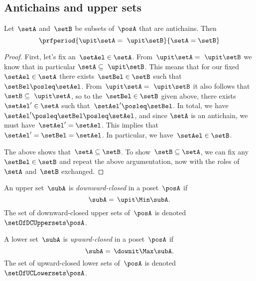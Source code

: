 \subsection{Antichains and upper sets}

\begin{lemma}
    \label{lem:up-cl-inj-antichains}
    Let~$\setA$ and~$\setB$ be subsets of~$\posA$ that are antichains.
    Then
    \begin{equation*}
        \prfperiod{\upit  \setA = \ \upit  \setB}{\setA = \setB}
    \end{equation*}
\end{lemma}

\begin{proof}
    First, let's fix an~$\setAel \in \setA$.
    From~$\upit  \setA = \ \upit  \setB$ we know that in particular $\setA \subseteq \ \upit  \setB$.
    This means that for our fixed~$\setAel \in \setA$ there exists~$\setBel \in \setB$ such that~$\setBel \posleq \setAel$.
    From~$\upit \setA = \ \upit  \setB$ it also follows that~$\setB \subseteq \ \upit  \setA$, so to the~$\setBel \in \setB$ given above, there exists~$\setAel' \in \setA$ such that~$\setAel' \posleq \setBel$.
    In total, we have~$\setAel' \posleq \setBel \posleq \setAel$, and since $\setA$ is an antichain, we must have~$\setAel' = \setAel$.
    This implies that~$\setAel' = \setBel = \setAel$.
    In particular, we have~$\setAel \in \setB$.

    The above shows that~$\setA \subseteq \setB$.
    To show~$\setB \subseteq \setA$, we can fix any~$\setBel \in \setB$ and repeat the above argumentation, now with the roles of~$\setA$ and~$\setB$ exchanged.
\end{proof}

\begin{definition}
    \label{def:downward-closed-upperset}
    An upper set~$\subA$ is \emph{downward-closed} in a poset~$\posA$ if
    \begin{equation}
        \subA =\, \upit  \Min \subA.
    \end{equation}
    The set of downward-closed upper sets of~$\posA$ is denoted~$\setOfDCUppersets \posA$.

\end{definition}

\begin{definition}
    \label{def:upward-closed-lowerset}
    A lower set~$\subA$ is \emph{upward-closed} in a poset~$\posA$ if
    \begin{equation}
        \subA =\, \downit  \Max \subA.
    \end{equation}
    The set of upward-closed lower sets of~$\posA$ is denoted~$\setOfUCLowersets \posA$.
\end{definition}
